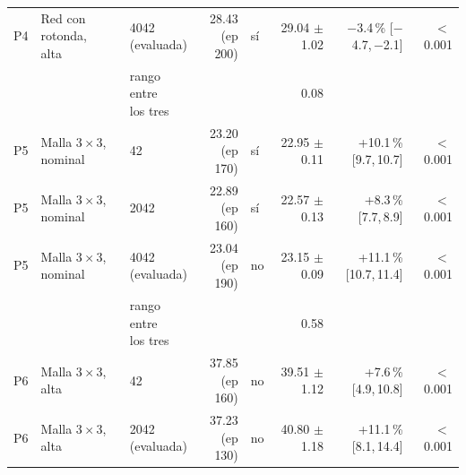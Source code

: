 \begin{table}[H]
\begin{tabular}{lllrlrrr}
P4 & \makecell[l]{Red con rotonda,\\{}alta} & \makecell[l]{4042\\{}(evaluada)} & \makecell[r]{28.43\\{}(ep 200)} & sí & \makecell[r]{29.04\\{}$\pm$ 1.02} & \makecell[r]{$-$3.4\,\%\\{}[$-$4.7,\,$-$2.1]} & $<$\,0.001 \\
 & & \makecell[l]{rango entre\\{}los tres} & & & 0.08 & & \\
P5 & \makecell[l]{Malla $3 \times 3$,\\{}nominal} & 42 & \makecell[r]{23.20\\{}(ep 170)} & sí & \makecell[r]{22.95\\{}$\pm$ 0.11} & \makecell[r]{+10.1\,\%\\{}[9.7,\,10.7]} & $<$\,0.001 \\
P5 & \makecell[l]{Malla $3 \times 3$,\\{}nominal} & 2042 & \makecell[r]{22.89\\{}(ep 160)} & sí & \makecell[r]{22.57\\{}$\pm$ 0.13} & \makecell[r]{+8.3\,\%\\{}[7.7,\,8.9]} & $<$\,0.001 \\
P5 & \makecell[l]{Malla $3 \times 3$,\\{}nominal} & \makecell[l]{4042\\{}(evaluada)} & \makecell[r]{23.04\\{}(ep 190)} & no & \makecell[r]{23.15\\{}$\pm$ 0.09} & \makecell[r]{+11.1\,\%\\{}[10.7,\,11.4]} & $<$\,0.001 \\
 & & \makecell[l]{rango entre\\{}los tres} & & & 0.58 & & \\
P6 & \makecell[l]{Malla $3 \times 3$,\\{}alta} & 42 & \makecell[r]{37.85\\{}(ep 160)} & no & \makecell[r]{39.51\\{}$\pm$ 1.12} & \makecell[r]{+7.6\,\%\\{}[4.9,\,10.8]} & $<$\,0.001 \\
P6 & \makecell[l]{Malla $3 \times 3$,\\{}alta} & \makecell[l]{2042\\{}(evaluada)} & \makecell[r]{37.23\\{}(ep 130)} & no & \makecell[r]{40.80\\{}$\pm$ 1.18} & \makecell[r]{+11.1\,\%\\{}[8.1,\,14.4]} & $<$\,0.001 \\

\end{tabular}
\end{table}
